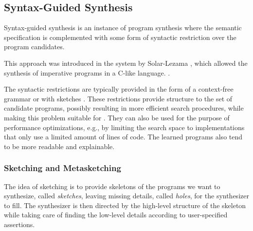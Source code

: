 \subsection{Syntax-Guided Synthesis}
\label{sec:sygus}


Syntax-guided synthesis is an instance of program synthesis where the semantic
specification is complemented with some form of syntactic restriction over the
program candidates.

This approach was introduced in the  system by Solar-Lezama \cite{Solar-Lezama:2008}, which allowed the
synthesis of imperative programs in a C-like language.
 \cite{Alur:sygus:2013}.

The syntactic restrictions are typically provided in the form of a context-free
grammar \cite{Alur:sygus:2013} or with sketches \cite{Solar-Lezama:2008}.
These restrictions provide structure to the set of candidate programs, possibly
resulting in more efficient search procedures, while making this problem
suitable for  \cite{Alur:sygus:2013}. They can also be used for the purpose of
performance optimizations, e.g., by limiting the search space to implementations
that only use a limited amount of lines of code.
The learned programs also tend to be more readable and explainable.


\subsubsection{Sketching and Metasketching}
\label{sec:sketching}


The idea of sketching is to provide skeletons of the programs we want to
synthesize, called \textit{sketches}, leaving missing details, called
\textit{holes}, for the synthesizer to fill.
The synthesizer is then directed by the high-level structure of the skeleton
while taking care of finding the low-level details according to user-specified
assertions.

